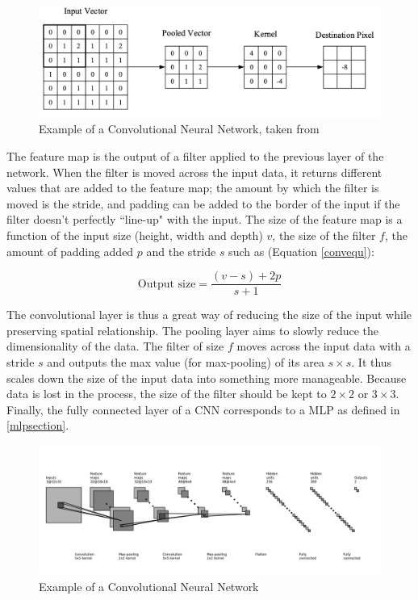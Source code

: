 \begin{figure}[H]
\centering
\includegraphics[scale=0.3]{Figures/conv2D.png}
\caption{Example of a Convolutional Neural Network, taken from \cite{cnnintro}}
\label{conv2D}
\end{figure}


The feature map is the output of a filter applied to the previous layer of the network. When the filter is moved across the input data, it returns different values that are added to the feature map; the amount by which the filter is moved is the stride, and padding can be added to the border of the input if the filter doesn't perfectly ``line-up" with the input. The size of the feature map is a function of the input size (height, width and depth) $v$, the size of the filter $f$, the amount of padding added $p$ and the stride $s$ such as (Equation \ref{convequ}):

\begin{equation}
\label{convequ}
	\text{Output size} = \frac{(v-s)+2p}{s+1}
\end{equation}

The convolutional layer is thus a great way of reducing the size of the input while preserving spatial relationship. \newline
The pooling layer aims to slowly reduce the dimensionality of the data. The filter of size $f$ moves across the input data with a stride $s$ and outputs the max value (for max-pooling) of its area $s \times s$. It thus scales down the  size  of the input data into something more manageable. Because data is lost in the process, the size of the filter should be kept to $2 \times 2$ or $3 \times 3$.\newline
Finally, the fully connected layer of a CNN corresponds to a MLP as defined in \ref{mlpsection}.

\begin{figure}[H]
\centering
\includegraphics[scale=0.184]{Figures/cnn.png}
\caption{Example of a Convolutional Neural Network}
\label{cnnex}
\end{figure}

